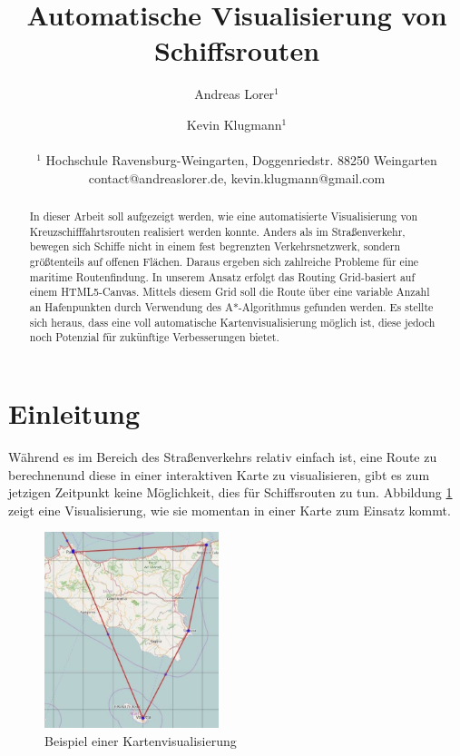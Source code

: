 \documentclass[letterpaper]{article}
\title{Automatische Visualisierung von Schiffsrouten}
\author{Andreas Lorer$^{1}$ \and  Kevin Klugmann$^{1}$\\
\mbox{}\\
$^{1}$ Hochschule Ravensburg-Weingarten, Doggenriedstr. 88250 Weingarten \\
contact@andreaslorer.de, kevin.klugmann@gmail.com}
\begin{document}
\maketitle

\begin{abstract}
	In dieser Arbeit soll aufgezeigt werden, wie eine automatisierte Visualisierung von Kreuzschifffahrtsrouten realisiert werden konnte.
	Anders als im Straßenverkehr, bewegen sich Schiffe nicht in einem fest begrenzten Verkehrsnetzwerk, sondern größtenteils auf offenen Flächen. Daraus ergeben sich zahlreiche Probleme für eine maritime Routenfindung. In unserem Ansatz erfolgt das Routing Grid-basiert auf einem HTML5-Canvas. Mittels diesem Grid soll die Route über eine variable Anzahl an Hafenpunkten durch Verwendung des A*-Algorithmus gefunden werden. Es stellte sich heraus, dass eine voll automatische Kartenvisualisierung möglich ist, diese jedoch noch Potenzial für zukünftige Verbesserungen bietet.
\end{abstract}

\section{Einleitung}
	Während es im Bereich des Straßenverkehrs relativ einfach ist, eine Route zu berechnen\footnotemark und diese in einer interaktiven Karte zu visualisieren, gibt es zum jetzigen Zeitpunkt keine Möglichkeit, dies für Schiffsrouten zu tun. Abbildung \ref{fig:visualisierungsproblem} zeigt eine Visualisierung, wie sie momentan in einer Karte zum Einsatz kommt. 


	\begin{figure}[!htb]
		\begin{center}
		\includegraphics[width=2in]{visualisierungsproblem}
		\caption{Beispiel einer Kartenvisualisierung}
		\label{fig:visualisierungsproblem}
		\end{center}
	\end{figure}
\end{document}
